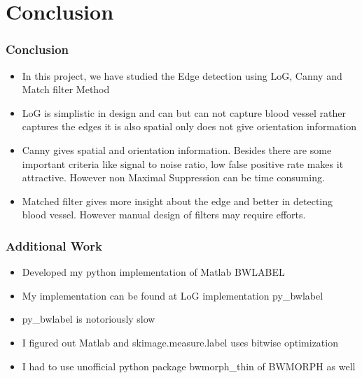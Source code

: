 \documentclass[11pt]{beamer}
\begin{document}
\section{Conclusion}
\begin{frame}
\frametitle{Conclusion}
\begin{itemize}
	\item In this project, we have studied the Edge detection using LoG, Canny and Match filter Method
	\item LoG is simplistic in design and can but can not capture blood vessel rather captures the edges it is also spatial only does not give orientation information
	\item Canny gives spatial and orientation information. Besides there are some important criteria like signal to noise ratio, low false positive rate makes it attractive. However non Maximal Suppression can be time consuming.
	\item Matched filter gives more insight about the edge and better in detecting blood vessel. However manual design of filters may require efforts.
\end{itemize}
\end{frame}

\begin{frame}
\frametitle{Additional Work}
\begin{itemize}
	\item Developed my python implementation of Matlab BWLABEL
	\item My implementation can be found at LoG implementation py\_bwlabel
	\item py\_bwlabel is notoriously slow
	\item I figured out Matlab and skimage.measure.label uses bitwise optimization
	\item I had to use unofficial python package bwmorph\_thin of BWMORPH as well
\end{itemize}
\end{frame}


\end{document}
